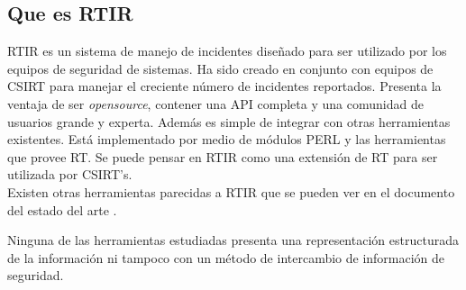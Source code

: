 \subsection{Que es RTIR}
RTIR es un sistema de manejo de incidentes diseñado para ser utilizado por los 
equipos de seguridad de sistemas. Ha sido creado en conjunto con equipos de CSIRT para manejar el creciente número de incidentes reportados.
Presenta la ventaja de ser \textit{opensource}, contener una API completa y una comunidad 
de usuarios grande y experta. Además es simple de integrar con otras 
herramientas existentes. Está implementado por medio de módulos PERL y las 
herramientas que provee RT. Se puede pensar en RTIR como una extensión de RT 
para ser utilizada por CSIRT's.\\

Existen otras herramientas parecidas a RTIR que se pueden ver en el documento del estado del arte \cite{AdvancedThreatsCollaboration}.

Ninguna de las herramientas estudiadas presenta una representación estructurada de la información ni tampoco con un método de intercambio de información de seguridad. 